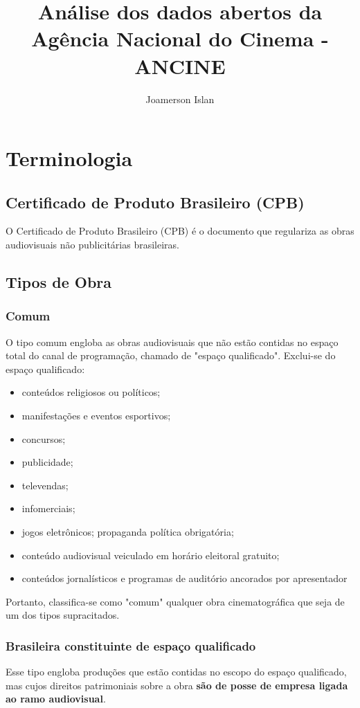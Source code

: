 \documentclass[portuguese,12pt,a4paper]{article}
\title{Análise dos dados abertos da Agência Nacional do Cinema - ANCINE}
\author{Joamerson Islan}
\begin{document}
	\maketitle
	
	\section{Terminologia}
	\subsection{Certificado de Produto Brasileiro (CPB)}
	O Certificado de Produto Brasileiro (CPB) é o documento que regulariza as obras audiovisuais não publicitárias brasileiras.
	\subsection{Tipos de Obra}
	\subsubsection{Comum}
	O tipo comum engloba as obras audiovisuais que não estão contidas no espaço total do canal de programação, chamado de "espaço qualificado". Exclui-se do espaço qualificado:
	\begin{itemize}
		\item conteúdos religiosos ou políticos;
		\item manifestações e eventos esportivos;
		\item concursos;
		\item publicidade;
		\item televendas;
		\item infomerciais;
		\item jogos eletrônicos; propaganda política obrigatória;
		\item conteúdo audiovisual veiculado em horário eleitoral gratuito;
		\item conteúdos jornalísticos e programas de auditório ancorados
		por apresentador
	\end{itemize}
	Portanto, classifica-se como "comum" qualquer obra cinematográfica que seja de um dos tipos supracitados.
	\subsubsection{Brasileira constituinte de espaço qualificado}
	Esse tipo engloba produções que estão contidas no escopo do espaço qualificado, mas cujos direitos patrimoniais sobre a obra \textbf{são de posse de empresa ligada ao ramo audiovisual}.
\end{document}
